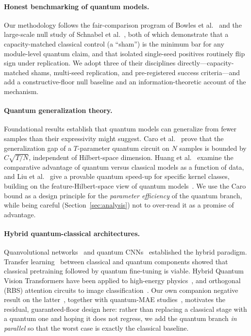 \documentclass[10pt,letterpaper]{article}
\theoremstyle{plain}
\theoremstyle{definition}
\begin{document}
\paragraph{Honest benchmarking of quantum models.}
Our methodology follows the fair-comparison program of
Bowles et al.~\cite{bowles2024} and the large-scale null study of
Schnabel et al.~\cite{schnabel2025}, both of which demonstrate that a
capacity-matched classical control (a ``sham'') is the minimum bar for any
module-level quantum claim, and that isolated single-seed positives routinely
flip sign under replication.
We adopt three of their disciplines directly---capacity-matched shams,
multi-seed replication, and pre-registered success criteria---and add a
constructive-floor null baseline and an information-theoretic account of the
mechanism.

\paragraph{Quantum generalization theory.}
Foundational results establish that quantum models can generalize from fewer
samples than their expressivity might suggest.
Caro et al.~\cite{caro2022} prove that the generalization gap of a $T$-parameter
quantum circuit on $N$ samples is bounded by $C\sqrt{T/N}$, independent of
Hilbert-space dimension. Huang et al.~\cite{huang2021power} examine the
comparative advantage of quantum versus classical models as a function of data,
and Liu et al.~\cite{liu2021rigorous} give a provable quantum speed-up for
specific kernel classes, building on the feature-Hilbert-space view of quantum
models~\cite{schuld2019kernel}. We use the Caro bound as a design principle for the
\emph{parameter efficiency} of the quantum branch, while being careful
(Section~\ref{sec:analysis}) not to over-read it as a promise of advantage.

\paragraph{Hybrid quantum-classical architectures.}
Quanvolutional networks~\cite{henderson2020quanvolutional} and quantum
CNNs~\cite{cong2019quantum} established the hybrid paradigm.
Transfer learning~\cite{mari2020transfer} between classical and quantum components
showed that classical pretraining followed by quantum fine-tuning is viable.
Hybrid Quantum Vision Transformers have been applied to high-energy
physics~\cite{unlu2024hybrid,comajoan2024quantum,tesi2024quantum}, and orthogonal
(RBS) attention circuits to image
classification~\cite{cherrat2022}. Our own companion negative result on the
latter~\cite{qovt_companion}, together with quantum-MAE
studies~\cite{andrews2025qmae}, motivates the residual, guaranteed-floor design
here: rather than replacing a classical stage with a quantum one and hoping it
does not regress, we add the quantum branch \emph{in parallel} so that the worst
case is exactly the classical baseline.
\end{document}
